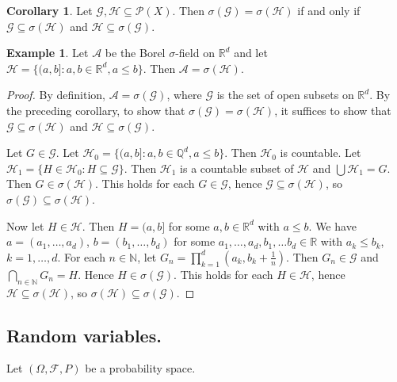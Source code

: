 \documentclass{article}
\newcommand{\R}{\mathbb{R}}
\newcommand{\Q}{\mathbb{Q}}
\newcommand{\N}{\mathbb{N}}
\newcommand{\F}{\mathscr{F}}
\theoremstyle{definition}
\newtheorem{corollary}[theorem]{Corollary}
\newtheorem*{example}{Example}
\begin{document}
\begin{corollary}
    Let $\mathscr{G}, \mathscr{H} \subseteq \mathcal{P}(X)$. Then $\sigma(\mathscr{G}) = \sigma(\mathscr{H})$ if and only if $\mathscr{G} \subseteq \sigma(\mathscr{H})$ and $\mathscr{H} \subseteq \sigma(\mathscr{G})$.
\end{corollary}

\begin{example}
    Let $\mathscr{A}$ be the Borel $\sigma$-field on $\R^d$ and let $\mathscr{H} = \{(a, b] : a, b \in \R^d, a \leq b\}$. Then $\mathscr{A} = \sigma(\mathscr{H})$.
    \begin{proof}
        By definition, $\mathscr{A} = \sigma(\mathscr{G})$, where $\mathscr{G}$ is the set of open subsets on $\R^d$. By the preceding corollary, to show that $\sigma(\mathscr{G}) = \sigma(\mathscr{H})$, it suffices to show that $\mathscr{G} \subseteq \sigma(\mathscr{H})$ and $\mathscr{H}\subseteq \sigma(\mathscr{G})$.
        
        Let $G \in \mathscr{G}$. Let $\mathscr{H}_0 = \{(a, b] : a, b \in \Q^d, a \leq b\}$.
        Then $\mathscr{H}_0$ is countable. Let $\mathscr{H}_1 = \{H \in \mathscr{H}_0 : H \subseteq \mathscr{G}\}$. Then $\mathscr{H}_1$ is a countable subset of $\mathscr{H}$ and $\bigcup \mathscr{H}_1 = G$. Then $G \in \sigma(\mathscr{H})$.
        This holds for each $G \in \mathscr{G}$, hence $\mathscr{G} \subseteq \sigma(\mathscr{H})$, so $\sigma(\mathscr{G}) \subseteq \sigma(\mathscr{H})$.
        
        Now let $H \in \mathscr{H}$. Then $H = (a, b]$ for some $a, b \in \R^d$ with $a \leq b$. We have $a = (a_1, \ldots, a_d)$, $b = (b_1, \ldots, b_d)$ for some $a_1, \ldots, a_d, b_1, \ldots b_d \in \R$ with $a_k \leq b_k$, $k = 1, \ldots, d$.
        For each $n \in \N$, let $G_n = \prod_{k=1}^d (a_k, b_k + \frac{1}{n})$. Then $G_n \in \mathscr{G}$ and $\bigcap_{n \in \N} G_n = H$. Hence $H \in \sigma(\mathscr{G})$. This holds for each $H \in \mathscr{H}$, hence $\mathscr{H} \subseteq \sigma(\mathscr{H})$, so $\sigma(\mathscr{H}) \subseteq \sigma(\mathscr{G})$.
    \end{proof}
\end{example}

\subsection*{Random variables.}
Let $(\Omega, \F, P)$ be a probability space.
\end{document}
